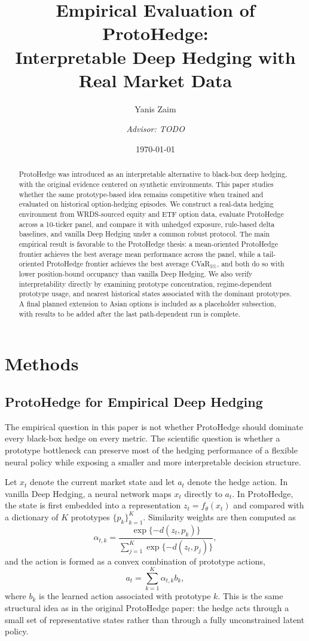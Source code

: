 \documentclass[11pt]{article}
\title{Empirical Evaluation of ProtoHedge:\\Interpretable Deep Hedging with Real Market Data}
\author{Yanis Zaim \and \textit{Advisor: TODO}}
\date{\today}
\begin{document}
\maketitle

\begin{abstract}
ProtoHedge was introduced as an interpretable alternative to black-box deep hedging, with the original evidence centered on synthetic environments. This paper studies whether the same prototype-based idea remains competitive when trained and evaluated on historical option-hedging episodes. We construct a real-data hedging environment from WRDS-sourced equity and ETF option data, evaluate ProtoHedge across a 10-ticker panel, and compare it with unhedged exposure, rule-based delta baselines, and vanilla Deep Hedging under a common robust protocol. The main empirical result is favorable to the ProtoHedge thesis: a mean-oriented ProtoHedge frontier achieves the best average mean performance across the panel, while a tail-oriented ProtoHedge frontier achieves the best average CVaR$_{5\%}$, and both do so with lower position-bound occupancy than vanilla Deep Hedging. We also verify interpretability directly by examining prototype concentration, regime-dependent prototype usage, and nearest historical states associated with the dominant prototypes. A final planned extension to Asian options is included as a placeholder subsection, with results to be added after the last path-dependent run is complete.
\end{abstract}

\section{Methods}

\subsection{ProtoHedge for Empirical Deep Hedging}
The empirical question in this paper is not whether ProtoHedge should dominate every black-box hedge on every metric. The scientific question is whether a prototype bottleneck can preserve most of the hedging performance of a flexible neural policy while exposing a smaller and more interpretable decision structure.

Let $x_t$ denote the current market state and let $a_t$ denote the hedge action. In vanilla Deep Hedging, a neural network maps $x_t$ directly to $a_t$. In ProtoHedge, the state is first embedded into a representation $z_t = f_\theta(x_t)$ and compared with a dictionary of $K$ prototypes $\{p_k\}_{k=1}^K$. Similarity weights are then computed as
\[
\alpha_{t,k} = \frac{\exp\{-d(z_t,p_k)\}}{\sum_{j=1}^K \exp\{-d(z_t,p_j)\}},
\]
and the action is formed as a convex combination of prototype actions,
\[
a_t = \sum_{k=1}^K \alpha_{t,k} b_k,
\]
where $b_k$ is the learned action associated with prototype $k$. This is the same structural idea as in the original ProtoHedge paper: the hedge acts through a small set of representative states rather than through a fully unconstrained latent policy.
\end{document}
